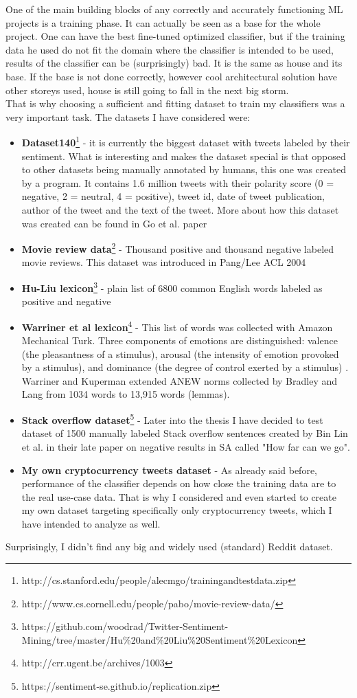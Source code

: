 One of the main building blocks of any correctly and accurately functioning ML projects is a training phase. It can actually be seen as a base for the whole project. One can have the best fine-tuned optimized classifier, but if the training data he used do not fit the domain where the classifier is intended to be used, results of the classifier can be (surprisingly) bad. It is the same as house and its base. If the base is not done correctly, however cool architectural solution have other storeys used, house is still going to fall in the next big storm.\\
That is why choosing a sufficient and fitting dataset to train my classifiers was a very important task. The datasets I have considered were:
\begin{itemize}
  \item \textbf{Dataset140}\footnote{http://cs.stanford.edu/people/alecmgo/trainingandtestdata.zip} - it is currently the biggest dataset with tweets labeled by their sentiment. What is interesting and makes the dataset special is that opposed to other datasets being manually annotated by humans, this one was created by a program. It contains 1.6 million tweets with their polarity score (0 = negative, 2 = neutral, 4 = positive), tweet id, date of tweet publication, author of the tweet and the text of the tweet. More about how this dataset was created can be found in Go et al. paper \cite{go2009twitter}
  \item \textbf{Movie review data}\footnote{http://www.cs.cornell.edu/people/pabo/movie-review-data/} - Thousand positive and thousand negative labeled movie reviews. This dataset was introduced in Pang/Lee ACL 2004 \cite{pang2004sentimental}
  \item \textbf{Hu-Liu lexicon}\footnote{https://github.com/woodrad/Twitter-Sentiment-Mining/tree/master/Hu\%20and\%20Liu\%20Sentiment\%20Lexicon} - plain list of 6800 common English words labeled as positive and negative
  \item \textbf{Warriner et al lexicon}\footnote{http://crr.ugent.be/archives/1003} - This list of words was collected with Amazon Mechanical Turk. Three components of emotions are distinguished: valence (the pleasantness of a stimulus), arousal (the intensity of emotion provoked by a stimulus), and dominance (the degree of control exerted by a stimulus) \cite{warriner2013norms}. Warriner and Kuperman extended ANEW norms collected by Bradley and Lang from 1034 words to 13,915 words (lemmas).
  \item \textbf{Stack overflow dataset}\footnote{https://sentiment-se.github.io/replication.zip} - Later into the thesis I have decided to test dataset of 1500 manually labeled Stack overflow sentences created by Bin Lin et al. in their late paper on negative results in SA called "How far can we go".
    \item \textbf{My own cryptocurrency tweets dataset} - As already said before, performance of the classifier depends on how close the training data are to the real use-case data. That is why I considered and even started to create my own dataset targeting specifically only cryptocurrency tweets, which I have intended to analyze as well.
\end{itemize}

Surprisingly, I didn't find any big and widely used (standard) Reddit dataset.